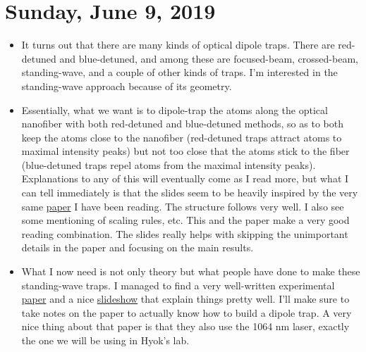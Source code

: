 \documentclass{book}
\theoremstyle{definition}
\begin{document}
\section*{Sunday, June 9, 2019}



\begin{itemize}
	\item It turns out that there are many kinds of optical dipole traps. There are red-detuned and blue-detuned, and among these are focused-beam, crossed-beam, standing-wave, and a couple of other kinds of traps. I'm interested in the standing-wave approach because of its geometry. 
	
	\item Essentially, what we want is to dipole-trap the atoms along the optical nanofiber with both red-detuned and blue-detuned methods, so as to both keep the atoms close to the nanofiber (red-detuned traps attract atoms to maximal intensity peaks) but not too close that the atoms stick to the fiber (blue-detuned traps repel atoms from the maximal intensity peaks). Explanations to any of this will eventually come as I read more, but what I can tell immediately is that the slides seem to be heavily inspired by the very same \href{https://arxiv.org/pdf/physics/9902072.pdf}{paper} I have been reading. The structure follows very well. I also see some mentioning of scaling rules, etc. This and the paper make a very good reading combination. The slides really helps with skipping the unimportant details in the paper and focusing on the main results. 
	
	\item What I now need is not only theory but what people have done to make these standing-wave traps. I managed to find a very well-written experimental \href{http://quantum-technologies.iap.uni-bonn.de/de/component/publications/?task=download\&file=69\&token=de46701d9e5eb9e185abc9784c3f8313}{paper} and a nice \href{https://www.mpq.mpg.de/5020867/0515b_atom_traps.pdf}{slideshow} that explain things pretty well. I'll make sure to take notes on the paper to actually know how to build a dipole trap. A very nice thing about that paper is that they also use the 1064 nm laser, exactly the one we will be using in Hyok's lab.
	
	
	

\end{itemize}
\end{document}
